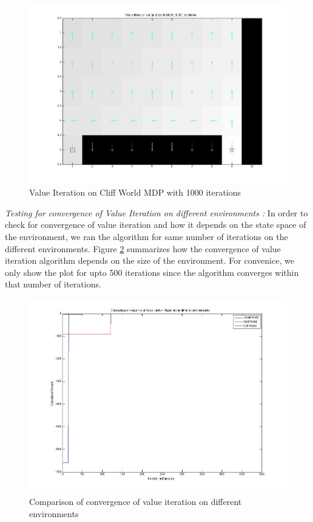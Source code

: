 \documentclass{article}\usepackage[]{graphicx}\usepackage[]{color}
\theoremstyle{plain}
\begin{document}
\begin{figure}[h!]
  \includegraphics[scale=0.4]{value1000_Cliffworld.jpg}
  \caption{Value Iteration on Cliff World MDP with 1000 iterations}
  \label{figure6}
\end{figure}








\noindent
\textit{Testing for convergence of Value Iteration on different environments : } In order to check for convergence of value iteration and how it depends on the state space of the environment, we ran the algorithm for same number of iterations on the different environments. Figure \ref{figure7} summarizes how the convergence of value iteration algorithm depends on the size of the environment. For convenice, we only show the plot for upto 500 iterations since the algorithm converges within that number of iterations.

\begin{figure}[h!]
  \includegraphics[scale=0.4]{comparison.jpg}
  \caption{Comparison of convergence of value iteration on different environments}
  \label{figure7}
\end{figure}
\end{document}
